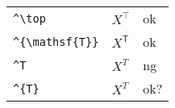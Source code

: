\documentclass[preview]{standalone}
\newcommand{\tA}[1]{\textcolor{cA}{#1}}
\newcommand{\tC}[1]{\textcolor{cC}{#1}}
\newcommand{\tD}[1]{\textcolor{cD}{#1}}
\begin{document}
\begin{table}[H]
    \centering
    \begin{tabular}{lll}
        \verb|^\top|         & $X^\top$         & \tA{ok}  \\
        \verb|^{\mathsf{T}}| & $X^{\mathsf{T}}$ & \tA{ok}  \\
        \verb|^T|            & $X^T$            & \tD{ng}  \\
        \verb|^{T}|          & $X^{T}$          & \tC{ok?} \\
    \end{tabular}
\end{table}
\end{document}
